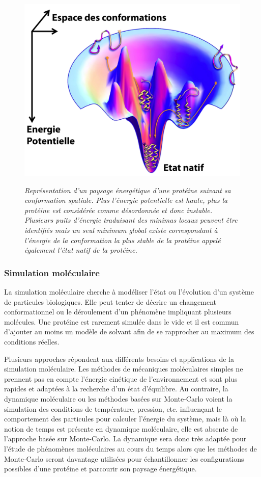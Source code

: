 \begin{figure}
  \centering
  {\includegraphics[width=0.65\linewidth]{./figures/ch1/energy_landscape_edit.png}}
    \caption[Représentation d'un paysage énergétique d'une protéine suivant sa conformation spatiale.]{\it Représentation d'un paysage énergétique d'une protéine suivant sa conformation spatiale. Plus l'énergie potentielle est haute, plus la protéine est considérée comme désordonnée et donc instable. Plusieurs puits d'énergie traduisant des minimas locaux peuvent être identifiés mais un seul minimum global existe correspondant à l'énergie de la conformation la plus stable de la protéine appelé également l'état natif de la protéine.}
    \label{Fig:energy_landscape_edit}
  \hspace{0.2cm}
\end{figure}
 

\subsubsection{Simulation moléculaire} \label{simu}


La simulation moléculaire cherche à modéliser l'état ou l'évolution d'un système de particules biologiques. Elle peut tenter de décrire un changement conformationnel ou le déroulement d'un phénomène impliquant plusieurs molécules.
Une protéine est rarement simulée dans le vide et il est commun d'ajouter au moins un modèle de solvant afin de se rapprocher au maximum des conditions réelles.

Plusieurs approches répondent aux différents besoins et applications de la simulation moléculaire. 
Les méthodes de mécaniques moléculaires simples ne prennent pas en compte l'énergie cinétique de l'environnement et sont plus rapides et adaptées à la recherche d'un état d'équilibre. Au contraire, la dynamique moléculaire ou les méthodes basées sur Monte-Carlo voient la simulation des conditions de température, pression, etc. influençant le comportement des particules pour calculer l'énergie du système, mais là où la notion de temps est présente en dynamique moléculaire, elle est absente de l'approche basée sur Monte-Carlo. La dynamique sera donc très adaptée pour l'étude de phénomènes moléculaires au cours du temps alors que les méthodes de Monte-Carlo seront davantage utilisées pour échantillonner les configurations possibles d'une protéine et parcourir son paysage énergétique.


